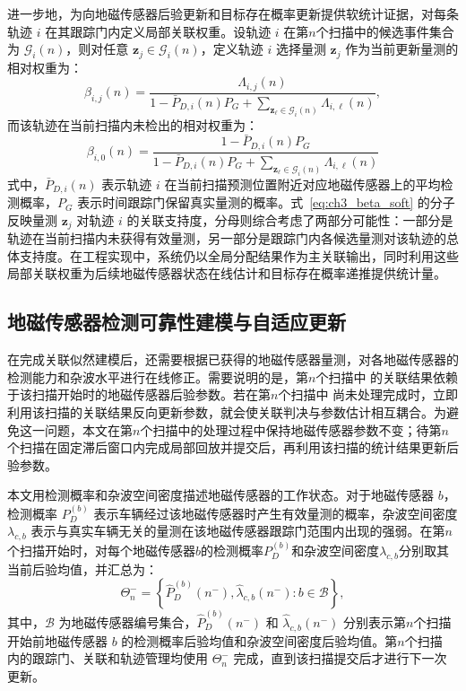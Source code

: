 \documentclass{xdupgthesis}
\begin{document}
进一步地，为向地磁传感器后验更新和目标存在概率更新提供软统计证据，对每条轨迹 $i$ 在其跟踪门内定义局部关联权重。设轨迹 $i$ 在第$n$个扫描中的候选事件集合为 $\mathcal G_i(n)$，则对任意 $\mathbf z_j\in\mathcal G_i(n)$，定义轨迹 $i$ 选择量测 $\mathbf z_j$ 作为当前更新量测的相对权重为：
\begin{equation}
	\beta_{i,j}(n)=
	\frac{\Lambda_{i,j}(n)}{1-\bar P_{D,i}(n)P_G+\sum\limits_{\mathbf z_\ell\in\mathcal G_i(n)}\Lambda_{i,\ell}(n)},
	\label{eq:ch3_beta_soft}
\end{equation}
而该轨迹在当前扫描内未检出的相对权重为：
\begin{equation}
	\beta_{i,0}(n)=
	\frac{1-\bar P_{D,i}(n)P_G}{1-\bar P_{D,i}(n)P_G+\sum\limits_{\mathbf z_\ell\in\mathcal G_i(n)}\Lambda_{i,\ell}(n)}
	\label{eq:ch3_beta_miss}
\end{equation}
式中，$\bar P_{D,i}(n)$ 表示轨迹 $i$ 在当前扫描预测位置附近对应地磁传感器上的平均检测概率，$P_G$ 表示时间跟踪门保留真实量测的概率。式~\eqref{eq:ch3_beta_soft} 的分子反映量测 $\mathbf z_j$ 对轨迹 $i$ 的关联支持度，分母则综合考虑了两部分可能性：一部分是轨迹在当前扫描内未获得有效量测，另一部分是跟踪门内各候选量测对该轨迹的总体支持度。在工程实现中，系统仍以全局分配结果作为主关联输出，同时利用这些局部关联权重为后续地磁传感器状态在线估计和目标存在概率递推提供统计量。

\subsection{地磁传感器检测可靠性建模与自适应更新}
\label{subsec:ch3_node_stats}

在完成关联似然建模后，还需要根据已获得的地磁传感器量测，对各地磁传感器的检测能力和杂波水平进行在线修正。需要说明的是，第$n$个扫描中 的关联结果依赖于该扫描开始时的地磁传感器后验参数。若在第$n$个扫描中 尚未处理完成时，立即利用该扫描的关联结果反向更新参数，就会使关联判决与参数估计相互耦合。为避免这一问题，本文在第$n$个扫描中的处理过程中保持地磁传感器参数不变；待第$n$个扫描在固定滞后窗口内完成局部回放并提交后，再利用该扫描的统计结果更新后验参数。

本文用检测概率和杂波空间密度描述地磁传感器的工作状态。对于地磁传感器 $b$，检测概率 $P_D^{(b)}$ 表示车辆经过该地磁传感器时产生有效量测的概率，杂波空间密度 $\lambda_{c,b}$ 表示与真实车辆无关的量测在该地磁传感器跟踪门范围内出现的强弱。在第$n$个扫描开始时，对每个地磁传感器$b$的检测概率$P_D^{(b)}$和杂波空间密度$\lambda_{c,b}$分别取其当前后验均值，并汇总为：
\begin{equation}
	\Theta_n^{-}
	=
	\left\{
	\hat P_D^{(b)}(n^-),\hat\lambda_{c,b}(n^-):b\in\mathcal B
	\right\},
	\label{eq:ch3_theta_frozen}
\end{equation}
其中，$\mathcal B$ 为地磁传感器编号集合，$\hat P_D^{(b)}(n^-)$ 和 $\hat\lambda_{c,b}(n^-)$ 分别表示第$n$个扫描 开始前地磁传感器 $b$ 的检测概率后验均值和杂波空间密度后验均值。第$n$个扫描 内的跟踪门、关联和轨迹管理均使用 $\Theta_n^{-}$ 完成，直到该扫描提交后才进行下一次更新。
\end{document}
